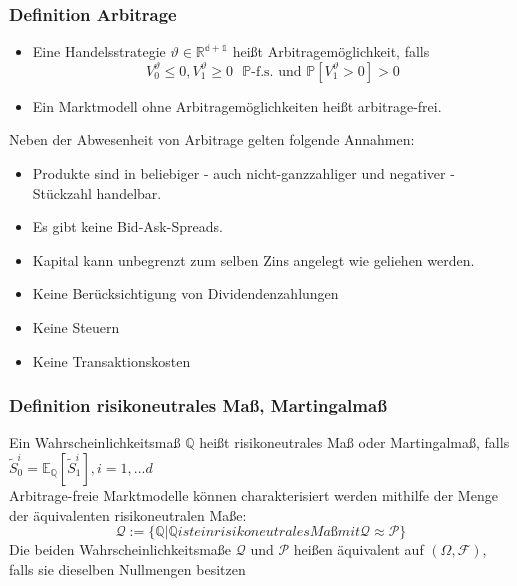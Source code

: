 \documentclass[12pt]{report}
\theoremstyle{dotless}
\theoremstyle{definition}
\begin{document}
\subsubsection{Definition Arbitrage}
\begin{itemize}
\item Eine Handelsstrategie $\vartheta \in \mathbb{R^{d+1}}$ heißt Arbitragemöglichkeit, falls
\begin{equation}
V_0^\vartheta \leq 0, V_1^\vartheta\geq0 \text{ } \mathbb{P}\text{-f.s. und }\mathbb{P}[V_1^\vartheta >0] >0
\end{equation}
\item Ein Marktmodell ohne Arbitragemöglichkeiten heißt arbitrage-frei.
\end{itemize}

Neben der Abwesenheit von Arbitrage gelten folgende Annahmen:
\begin{itemize}
\item Produkte sind in beliebiger - auch nicht-ganzzahliger und negativer - Stückzahl
handelbar.
\item Es gibt keine Bid-Ask-Spreads.
\item Kapital kann unbegrenzt zum selben Zins angelegt wie geliehen werden.
\item Keine Berücksichtigung von Dividendenzahlungen
\item Keine Steuern
\item Keine Transaktionskosten
\end{itemize}

\subsubsection{Definition risikoneutrales Maß, Martingalmaß}
Ein Wahrscheinlichkeitsmaß $\mathbb{Q}$ heißt risikoneutrales Maß oder Martingalmaß, falls \\ $\tilde{S}^i_0= \mathbb{E}_\mathbb{Q}[\tilde{S}^i_1], i=1,...d$ \\


Arbitrage-freie Marktmodelle können charakterisiert werden mithilfe der
Menge der äquivalenten risikoneutralen Maße: 
\begin{equation}
\mathcal{Q}:= \{\mathbb{Q} | \mathbb{Q} ist ein risikoneutrales Maß mit \mathcal{Q} \approx \mathcal{P}\}
\end{equation}
Die beiden Wahrscheinlichkeitsmaße $\mathcal{Q}$ und $\mathcal{P}$ heißen äquivalent auf $(\Omega, \mathcal{F})$, falls sie dieselben Nullmengen besitzen
\end{document}
